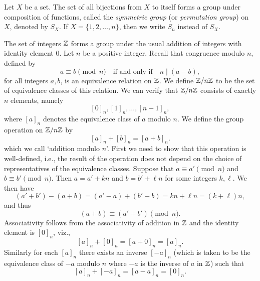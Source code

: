 \begin{definition}
    Let \(X\) be a set. The set of all bijections from \(X\) to itself forms a
    group under composition of functions, called the \emph{symmetric group} (or
    \emph{permutation group}) on \(X\), denoted by \(S_X\). If \(X = \{1, 2,
    \ldots, n\}\), then we write \(S_n\) instead of \(S_X\).
\end{definition}

\begin{example}[\(\Z\) and \(\Z/n\Z\)]
    \label{def:z-and-zmodn}
    The set of integers \(\Z\) forms a group under the usual addition of
    integers with identity element \(0\). Let \(n\) be a positive integer.
    Recall that congruence modulo \(n\), defined by
    \[
        a \equiv b \pmod{n} \quad \text{if and only if} \quad n \mid (a - b),
    \]
    for all integers \(a, b\), is an equivalence relation on \(\Z\). We define
    \(\Z/n\Z\) to be the set of equivalence classes of this relation. We can
    verify that \(\Z/n\Z\) consists of exactly \(n\) elements, namely
    \[
        [0]_n, [1]_n, \ldots, [n - 1]_n,
    \]
    where \([a]_n\) denotes the equivalence class of \(a\) modulo \(n\). We
    define the group operation on \(\Z/n\Z\) by
    \[
        [a]_n + [b]_n = [a + b]_n.
    \]
    which we call `addition modulo \(n\)'.  First we need to show that this
    operation is well-defined, i.e., the result of the operation does not depend
    on the choice of representatives of the equivalence classes. Suppose that
    \(a \equiv a' \pmod{n}\) and \(b \equiv b' \pmod{n}\). Then \(a = a' + kn\)
    and \(b = b' + \ell n\) for some integers \(k, \ell\). We then have
    \[
        (a' + b') - (a + b) = (a' - a) + (b' - b) = kn + \ell n = (k + \ell)n,
    \]
    and thus
    \[
        (a + b) \equiv (a' + b') \pmod{n}.
    \]
    Associativity follows from the associativity of addition in \(\Z\) and the
    identity element is \([0]_n\), viz.,
    \[
        [a]_n + [0]_n = [a + 0]_n = [a]_n.
    \]
    Similarly for each \([a]_n\) there exists an inverse \([-a]_n\) (which is
    taken to be the equivalence class of \(-a\) modulo \(n\) where \(-a\) is the
    inverse of \(a\) in \(\Z\)) such that
    \[
        [a]_n + [-a]_n = [a - a]_n = [0]_n.
    \]
\end{example}

